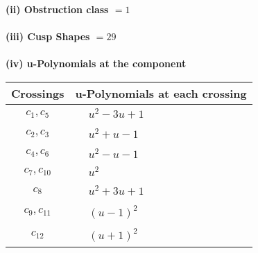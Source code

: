 \documentclass[1p]{elsarticle_modified}
\theoremstyle{definition}
\begin{document}
\flushleft \textbf{(ii) Obstruction class $= 1$}\\~\\
\flushleft \textbf{(iii) Cusp Shapes $= 29$}\\~\\
\newpage\renewcommand{\arraystretch}{1}
\flushleft \textbf{(iv) u-Polynomials at the component}\newline \\
\begin{tabular}{m{50pt}|m{274pt}}
Crossings & \hspace{64pt}u-Polynomials at each crossing \\
\hline $$\begin{aligned}c_{1},c_{5}\end{aligned}$$&$\begin{aligned}
&u^2-3 u+1
\end{aligned}$\\
\hline $$\begin{aligned}c_{2},c_{3}\end{aligned}$$&$\begin{aligned}
&u^2+u-1
\end{aligned}$\\
\hline $$\begin{aligned}c_{4},c_{6}\end{aligned}$$&$\begin{aligned}
&u^2- u-1
\end{aligned}$\\
\hline $$\begin{aligned}c_{7},c_{10}\end{aligned}$$&$\begin{aligned}
&u^2
\end{aligned}$\\
\hline $$\begin{aligned}c_{8}\end{aligned}$$&$\begin{aligned}
&u^2+3 u+1
\end{aligned}$\\
\hline $$\begin{aligned}c_{9},c_{11}\end{aligned}$$&$\begin{aligned}
&(u-1)^2
\end{aligned}$\\
\hline $$\begin{aligned}c_{12}\end{aligned}$$&$\begin{aligned}
&(u+1)^2
\end{aligned}$\\
\hline
\end{tabular}\\~\\
\end{document}
